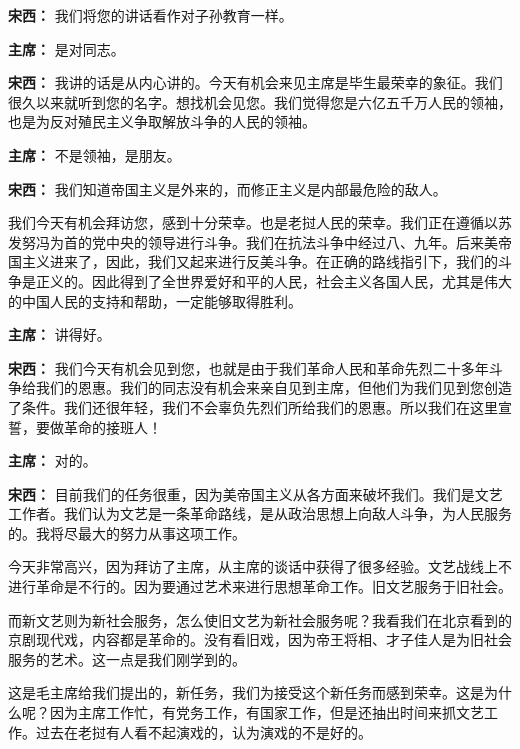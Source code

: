 \begin{duihua}
\item[\textbf{宋西：}] 我们将您的讲话看作对子孙教育一样。

\item[\textbf{主席：}] 是对同志。

\item[\textbf{宋西：}] 我讲的话是从内心讲的。今天有机会来见主席是毕生最荣幸的象征。我们很久以来就听到您的名字。想找机会见您。我们觉得您是六亿五千万人民的领袖，也是为反对殖民主义争取解放斗争的人民的领袖。

\item[\textbf{主席：}] 不是领袖，是朋友。

\item[\textbf{宋西：}] 我们知道帝国主义是外来的，而修正主义是内部最危险的敌人。

我们今天有机会拜访您，感到十分荣幸。也是老挝人民的荣幸。我们正在遵循以苏发努冯为首的党中央的领导进行斗争。我们在抗法斗争中经过八、九年。后来美帝国主义进来了，因此，我们又起来进行反美斗争。在正确的路线指引下，我们的斗争是正义的。因此得到了全世界爱好和平的人民，社会主义各国人民，尤其是伟大的中国人民的支持和帮助，一定能够取得胜利。

\item[\textbf{主席：}] 讲得好。

\item[\textbf{宋西：}] 我们今天有机会见到您，也就是由于我们革命人民和革命先烈二十多年斗争给我们的恩惠。我们的同志没有机会来亲自见到主席，但他们为我们见到您创造了条件。我们还很年轻，我们不会辜负先烈们所给我们的恩惠。所以我们在这里宣誓，要做革命的接班人！

\item[\textbf{主席：}] 对的。

\item[\textbf{宋西：}] 目前我们的任务很重，因为美帝国主义从各方面来破坏我们。我们是文艺工作者。我们认为文艺是一条革命路线，是从政治思想上向敌人斗争，为人民服务的。我将尽最大的努力从事这项工作。

今天非常高兴，因为拜访了主席，从主席的谈话中获得了很多经验。文艺战线上不进行革命是不行的。因为要通过艺术来进行思想革命工作。旧文艺服务于旧社会。

而新文艺则为新社会服务，怎么使旧文艺为新社会服务呢？我看我们在北京看到的京剧现代戏，内容都是革命的。没有看旧戏，因为帝王将相、才子佳人是为旧社会服务的艺术。这一点是我们刚学到的。

这是毛主席给我们提出的，新任务，我们为接受这个新任务而感到荣幸。这是为什么呢？因为主席工作忙，有党务工作，有国家工作，但是还抽出时间来抓文艺工作。过去在老挝有人看不起演戏的，认为演戏的不是好的。


\end{duihua}
